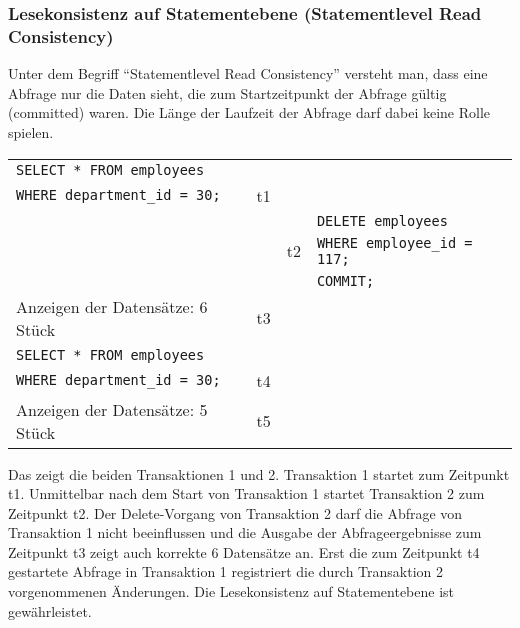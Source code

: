         \subsubsection{Lesekonsistenz auf Statementebene (Statementlevel Read Consistency)}
          \begin{merke}
            Unter dem Begriff \enquote{Statementlevel Read Consistency} versteht man, dass eine Abfrage nur die Daten sieht, die zum Startzeitpunkt der Abfrage gültig (committed) waren. Die Länge der Laufzeit der Abfrage darf dabei keine Rolle spielen.
          \end{merke}
          \tabletail{}
          \begin{supertabular}{lr|ll}
            \label{statementlevelreadconsistency}
            \small{\texttt{SELECT * FROM employees}} & & & \\
            \small{\texttt{WHERE department\_id = 30;}} & \scriptsize{t1} & & \\
            & & & \small{\texttt{DELETE employees}} \\
            & & \scriptsize{t2} & \small{\texttt{WHERE employee\_id = 117;}}\\
            & & & \texttt{COMMIT;} \\
            \small{Anzeigen der Datensätze: 6 Stück} & \scriptsize{t3} & & \\
            \small{\texttt{SELECT * FROM employees}} & & & \\
            \small{\texttt{WHERE department\_id = 30;}} & \scriptsize{t4} & & \\
            \small{Anzeigen der Datensätze: 5 Stück} & \scriptsize{t5} & & \\
          \end{supertabular}

          Das  zeigt die beiden Transaktionen 1 und 2. Transaktion 1 startet zum Zeitpunkt t1. Unmittelbar nach dem Start von Transaktion 1 startet Transaktion 2 zum Zeitpunkt t2. Der Delete-Vorgang von Transaktion 2 darf die Abfrage von Transaktion 1 nicht beeinflussen und die Ausgabe der Abfrageergebnisse zum Zeitpunkt t3 zeigt auch korrekte 6 Datensätze an. Erst die zum Zeitpunkt t4 gestartete Abfrage in Transaktion 1 registriert die durch Transaktion 2 vorgenommenen Änderungen. Die Lesekonsistenz auf Statementebene ist gewährleistet.
